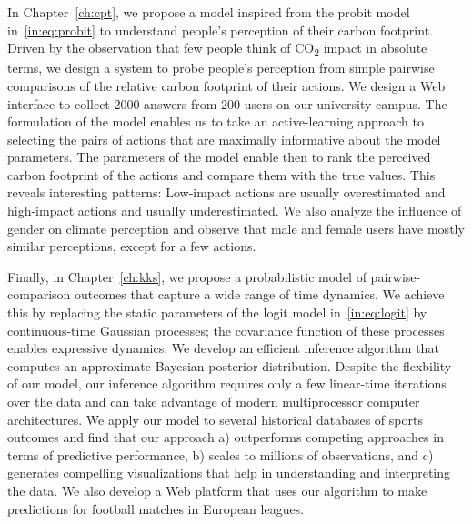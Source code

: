 In Chapter~\ref{ch:cpt}, we propose a model inspired from the probit model in~\eqref{in:eq:probit} to understand people's perception of their carbon footprint.
Driven by the observation that few people think of CO\textsubscript{2} impact in absolute terms, we design a system to probe people's perception from simple pairwise comparisons of the relative carbon footprint of their actions.
We design a Web interface to collect 2000 answers from 200 users on our university campus.
The formulation of the model enables us to take an active-learning approach to selecting the pairs of actions that are maximally informative about the model parameters.
The parameters of the model enable then to rank the perceived carbon footprint of the actions and compare them with the true values.
This reveals interesting patterns:
Low-impact actions are usually overestimated and high-impact actions and usually underestimated.
We also analyze the influence of gender on climate perception and observe that male and female users have mostly similar perceptions, except for a few actions.

Finally, in Chapter~\ref{ch:kks}, we propose a probabilistic model of pairwise-comparison outcomes that capture a wide range of time dynamics.
We achieve this by replacing the static parameters of the logit model in~\eqref{in:eq:logit} by continuous-time Gaussian processes; the covariance function of these processes enables expressive dynamics.
We develop an efficient inference algorithm that computes an approximate Bayesian posterior distribution.
Despite the flexbility of our model, our inference algorithm requires only a few linear-time iterations over the data and can take advantage of modern multiprocessor computer architectures.
We apply our model to several historical databases of sports outcomes and find that our approach a) outperforms competing approaches in terms of predictive performance, b) scales to millions of observations, and c) generates compelling visualizations that help in understanding and interpreting the data.
We also develop a Web platform that uses our algorithm to make predictions for football matches in European leagues.
